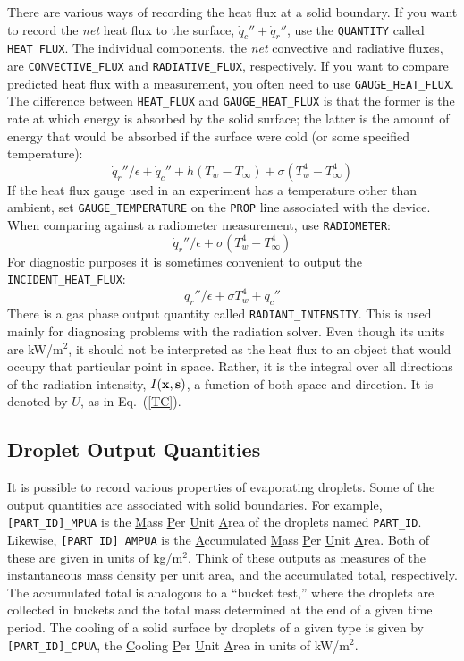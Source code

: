 \documentclass[11pt]{book}
\newcommand{\ct}{\tt\small}
\newcommand{\bx}{{\bf x}}
\newcommand{\bs}{{\bf s}}
\newcommand{\dq}{\dot{q}}
\begin{document}
There are various ways of recording the heat flux at a solid boundary. If you want to record the {\em net} heat flux to
the surface, $\dq_c'' + \dq_r''$, use the {\ct QUANTITY} called {\ct HEAT\_FLUX}. The individual components, the {\em net}
convective and radiative fluxes, are {\ct CONVECTIVE\_FLUX} and {\ct RADIATIVE\_FLUX}, respectively. If you want to compare
predicted heat flux with a measurement, you often need to use {\ct GAUGE\_HEAT\_FLUX}.
The difference between {\ct HEAT\_FLUX} and {\ct GAUGE\_HEAT\_FLUX} is that
the former is the rate at which energy is absorbed by the solid surface;
the latter is the amount of energy that would be absorbed if the surface were cold (or some specified temperature):
$$\dq_r''/\epsilon +\dq_c'' + h(T_w-T_\infty) + \sigma (T_w^4-T_\infty^4)$$
If the heat flux gauge used in an experiment has
a temperature other than ambient, set {\ct GAUGE\_TEMPERATURE} on the {\ct PROP} line associated with the device.
When comparing against a radiometer measurement, use {\ct RADIOMETER}:
$$\dq_r''/\epsilon + \sigma (T_w^4-T_\infty^4) $$
For diagnostic purposes it is sometimes convenient to output the {\ct INCIDENT\_HEAT\_FLUX}:
$$ \dq_r''/\epsilon + \sigma T_w^4 +\dq_c'' $$
There is a gas phase output quantity called {\ct RADIANT\_INTENSITY}. This is used mainly for diagnosing problems with the
radiation solver. Even though its units are kW/m$^2$, it should not be interpreted as the heat flux to an object that would
occupy that particular point in space. Rather, it is the integral over all directions of the radiation intensity, $I(\bx,\bs)$, a function of both
space and direction. It is denoted by $U$, as in Eq.~(\ref{TC}).


\subsection{Droplet Output Quantities}
\label{info:part_output}

It is possible to record various properties of evaporating droplets. Some of the output quantities are associated with solid boundaries. For example,
{\ct [PART\_ID]\_MPUA} is the \underline{M}ass \underline{P}er \underline{U}nit \underline{A}rea of the droplets named
{\ct PART\_ID}. Likewise, {\ct [PART\_ID]\_AMPUA} is the \underline{A}ccumulated \underline{M}ass \underline{P}er \underline{U}nit \underline{A}rea. Both of these
are given in units of kg/m$^2$. Think of these outputs as measures of the instantaneous mass density per unit area, and the accumulated total, respectively. The
accumulated total is analogous to a ``bucket test,'' where the droplets are collected in buckets and the total mass determined at the end of a given time
period. The cooling of a solid surface by droplets of a given type is given by {\ct [PART\_ID]\_CPUA}, the \underline{C}ooling \underline{P}er \underline{U}nit \underline{A}rea
in units of kW/m$^2$.
\end{document}
